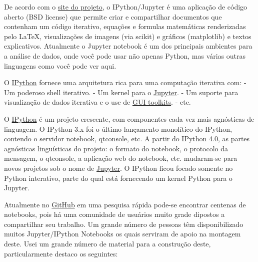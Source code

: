 \documentclass[11pt]{article}
\begin{document}
De acordo com o \href{http://ipython.org/}{site do projeto}, o
IPython/Jupyter é uma aplicação de código aberto (BSD license) que
permite criar e compartilhar documentos que contenham um código
iterativo, equações e formulas matemáticas renderizadas pelo LaTeX,
visualizações de imagens (via scikit) e gráficos (matplotlib) e textos
explicativos. Atualmente o Jupyter notebook é um dos principais
ambientes para a análise de dados, onde você pode usar não apenas
Python, mas várias outras linguagens como você pode ver aqui.

O \href{http://ipython.org}{IPython} fornece uma arquitetura rica para
uma computação iterativa com: - Um poderoso shell iterativo. - Um kernel
para o \href{https://jupyter.org/}{Jupyter}. - Um suporte para
visualização de dados iterativa e o use de
\href{http://ipython.org/ipython-doc/stable/interactive/reference.html\#gui-event-loop-support}{GUI
toolkits}. - etc.

O \href{http://ipython.org}{IPython} é um projeto crescente, com
componentes cada vez mais agnósticas de linguagem. O IPython 3.x foi o
último lançamento monolítico do IPython, contendo o servidor notebook,
qtconsole, etc. A partir do IPython 4.0, as partes agnósticas
linguísticas do projeto: o formato do notebook, o protocolo da mensagem,
o qtconsole, a aplicação web do notebook, etc. mudaram-se para novos
projetos sob o nome de \href{https://jupyter.org/}{Jupyter}. O IPython
ficou focado somente no Python interativo, parte do qual está fornecendo
um kernel Python para o Jupyter.

Atualmente no \href{https://github.com/}{GitHub} em uma pesquisa rápida
pode-se encontrar centenas de notebooks, pois há uma comunidade de
usuários muito grade dipostos a compartilhar seu trabalho. Um grande
número de pessoas têm disponibilizado muitos Jupyter/IPython Notebooks
os quais serviram de apoio na montagem deste. Usei um grande número de
material para a construção deste, particularmente destaco os seguintes:
\end{document}

